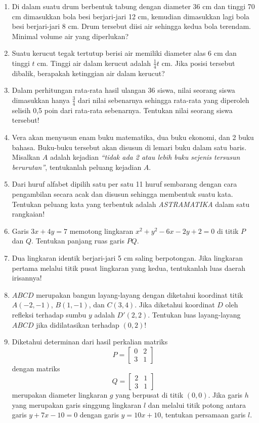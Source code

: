 \begin{enumerate}
\item Di dalam suatu drum berbentuk tabung dengan diameter 36 cm dan tinggi 70 cm dimasukkan bola besi berjari-jari 12 cm, kemudian dimasukkan lagi bola besi berjari-jari 8 cm. Drum tersebut diisi air sehingga kedua bola terendam. Minimal volume air yang diperlukan?

\item Suatu kerucut tegak tertutup berisi air memiliki diameter alas 6 cm dan tinggi $t$ cm. Tinggi air dalam kerucut adalah $\frac{1}{4}t$ cm. Jika posisi tersebut dibalik, berapakah ketinggian air dalam kerucut?

\item Dalam perhitungan rata-rata hasil ulangan 36 siswa, nilai seorang siswa dimasukkan hanya $\frac{3}{4}$ dari nilai sebenarnya sehingga rata-rata yang diperoleh selisih 0,5 poin dari rata-rata sebenarnya. Tentukan nilai seorang siswa tersebut!

\item Vera akan menyusun enam buku matematika, dua buku ekonomi, dan 2 buku bahasa. Buku-buku tersebut akan disusun di lemari buku dalam satu baris. Misalkan $A$ adalah kejadian \emph{``tidak ada 2 atau lebih buku sejenis tersusun berurutan''}, tentukanlah peluang kejadian $A$.

\item Dari huruf alfabet dipilih satu per satu 11 huruf sembarang dengan cara pengambilan secara acak dan disusun sehingga membentuk suatu kata. Tentukan peluang kata yang terbentuk adalah \emph{ASTRAMATIKA} dalam satu rangkaian!

\item Garis $3x+4y = 7$ memotong lingkaran $x^2+y^2-6x-2y+2=0$ di titik $P$ dan $Q$. Tentukan panjang ruas garis $PQ$.

\item Dua lingkaran identik berjari-jari 5 cm saling berpotongan. Jika lingkaran pertama melalui titik pusat lingkaran yang kedua, tentukanlah luas daerah irisannya!

\item $ABCD$ merupakan bangun layang-layang dengan diketahui koordinat titik $A(-2,-1)$, $B(1,-1)$, dan $C(3,4)$. Jika diketahui koordinat $D$ oleh refleksi terhadap sumbu $y$ adalah $D'(2,2)$. Tentukan luas layang-layang $ABCD$ jika didilatasikan terhadap $(0,2)$!

\item Diketahui determinan dari hasil perkalian matriks $$P=\begin{bmatrix}0&2\\3&1\end{bmatrix}$$ dengan matriks $$Q=\begin{bmatrix}2&1\\3&1\end{bmatrix}$$ merupakan diameter lingkaran $g$ yang berpusat di titik $(0,0)$. Jika garis $h$ yang merupakan garis singgung lingkaran $l$ dan melalui titik potong antara garis $y+7x-10=0$ dengan garis $y=10x+10$, tentukan persamaan garis $l$.


\end{enumerate}
